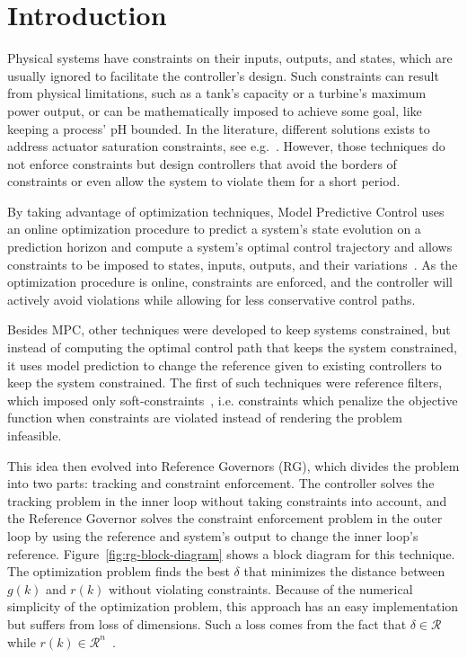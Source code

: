 
\chapter{Introduction}%
\label{chp:introduction}

Physical systems have constraints on their inputs, outputs, and states, which
are usually ignored to facilitate the controller's design. Such constraints can
result from physical limitations, such as a tank's capacity or a turbine's
maximum power output, or can be mathematically imposed to achieve some goal,
like keeping a process' pH bounded. In the literature, different solutions
exists to address actuator saturation constraints, see
e.g.~\parencite{klug.castelan.ea:fuzzy,tarbouriech.garcia.ea:stability}.
However, those techniques do not enforce constraints but design controllers that
avoid the borders of constraints or even allow the system to violate them for a
short period.

By taking advantage of optimization techniques, Model Predictive Control uses an
online optimization procedure to predict a system's state evolution on a
prediction horizon and compute a system's optimal control trajectory and allows
constraints to be imposed to states, inputs, outputs, and their
variations~\parencite{wang:model,zhang:fast}. As the optimization procedure is
online, constraints are enforced, and the controller will actively avoid
violations while allowing for less conservative control paths.

Besides MPC, other techniques were developed to keep systems constrained, but
instead of computing the optimal control path that keeps the system constrained,
it uses model prediction to change the reference given to existing controllers
to keep the system constrained. The first of such techniques were reference
filters, which imposed only
soft-constraints~\parencite{vahidi.kolmanovsky.ea:constraint}, i.e. constraints
which penalize the objective function when constraints are violated instead of
rendering the problem infeasible.

This idea then evolved into Reference Governors (RG), which divides the problem
into two parts: tracking and constraint enforcement. The controller solves the
tracking problem in the inner loop without taking constraints into account, and
the Reference Governor solves the constraint enforcement problem in the outer
loop by using the reference and system's output to change the inner loop's
reference. Figure~\ref{fig:rg-block-diagram} shows a block diagram for this
technique. The optimization problem finds the best \(\delta\) that minimizes the
distance between \(g(k)\) and \(r(k)\) without violating constraints. Because of
the numerical simplicity of the optimization problem, this approach has an easy
implementation but suffers from loss of dimensions. Such a loss comes from the
fact that \(\delta\in\mathcal{R}\) while
\(r(k)\in\mathcal{R}^n\)~\parencite{gilbert.kolmanovsky:fast}.


